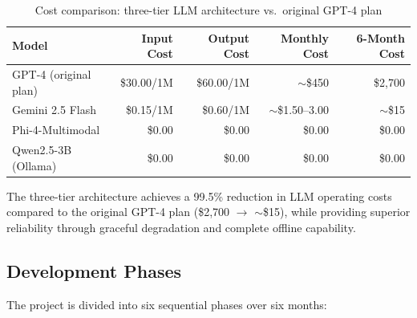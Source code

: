 \begin{table}[htbp]
    \centering
    \caption{Cost comparison: three-tier LLM architecture vs.\ original GPT-4 plan}
    \label{tab:ch01_llm_cost}
    \begin{tabular}{lrrrr}
        \toprule
        Model & Input Cost & Output Cost & Monthly Cost & 6-Month Cost \\
        \midrule
        GPT-4 (original plan) & \$30.00/1M & \$60.00/1M & $\sim$\$450 & \$2,700 \\
        Gemini 2.5 Flash & \$0.15/1M & \$0.60/1M & $\sim$\$1.50--3.00 & $\sim$\$15 \\
        Phi-4-Multimodal & \$0.00 & \$0.00 & \$0.00 & \$0.00 \\
        Qwen2.5-3B (Ollama) & \$0.00 & \$0.00 & \$0.00 & \$0.00 \\
        \bottomrule
    \end{tabular}
\end{table}

The three-tier architecture achieves a 99.5\% reduction in LLM operating costs compared to the original GPT-4 plan (\$2,700 $\rightarrow$ $\sim$\$15), while providing superior reliability through graceful degradation and complete offline capability.

\subsection{Development Phases}

The project is divided into six sequential phases over six months:

